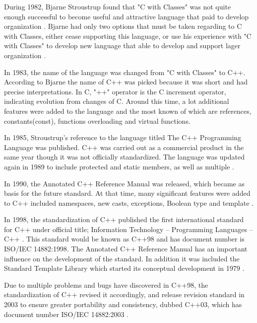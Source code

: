 \documentclass[11pt]{report}
\begin{document}
During 1982, Bjarne Stroustrup found that "C with Classes" was not quite enough successful to become useful and attractive language that paid to develop organization \cite{StroustrupHistory}. Bjarne had only two options that must be taken regarding to C with Classes, either cease supporting this language, or use his experience with "C with Classes" to develop new language that able to develop and support lager organization \cite{Stroustrup:1994:DesignEvolution}.

In 1983, the name of the language was changed from "C with Classes" to C++. According to Bjarne \cite{Stroustrup:1994:DesignEvolution} the name of C++ was picked because it was short and had precise interpretations. In C, "++" operator is the C increment operator, indicating evolution from changes of C.  Around this time, a lot additional features were added to the language and the most known of which are references, constants(const), functions overloading and virtual functions.

In 1985, Stroustrup's reference to the language titled The C++ Programming Language was published. C++ was carried out as a commercial product in the same year though it was not officially standardized. The language was updated again in 1989 to include protected and static members, as well as multiple \cite{CplusplusHistoryofCpp}.

In 1990, the Annotated C++ Reference Manual was released, which became as basis for the future standard. At that time, many significant features were added to C++ included namespaces, new casts, exceptions, Boolean type and template \cite{StroustrupHistory}.

In 1998, the standardization of C++ published the first international standard for C++ under official title; Information Technology -- Programming Languages -- C++ \cite{Josuttis:2012:CppStandardLibrary}. This standard would be known as C++98 and has document number is ISO/IEC 14882:1998. The Annotated C++ Reference Manual has an important influence on the development of the standard.  In addition it was included the Standard Template Library which started its conceptual development in 1979 \cite{CplusplusHistoryofCpp}.  

Due to multiple problems and bugs have discovered in C++98, the standardization of C++ revised it accordingly, and release revision standard in 2003 to ensure greater portability and consistency, dubbed C++03, which has document number ISO/IEC 14882:2003 \cite{Josuttis:2012:CppStandardLibrary}.
\end{document}
